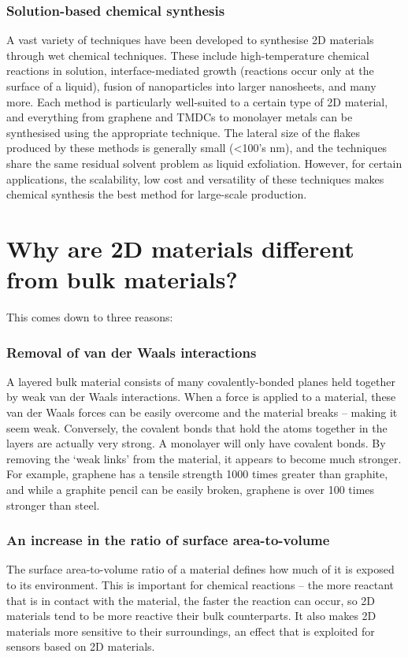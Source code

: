 \documentclass[12pt,a4paper]{report}
\begin{document}
\subsubsection{Solution-based chemical synthesis}
A vast variety of techniques have been developed to synthesise 2D materials through wet chemical techniques. These include high-temperature chemical reactions in solution, interface-mediated growth (reactions occur only at the surface of a liquid), fusion of nanoparticles into larger nanosheets, and many more. Each method is particularly well-suited to a certain type of 2D material, and everything from graphene and TMDCs to monolayer metals can be synthesised using the appropriate technique.
The lateral size of the flakes produced by these methods is generally small (<100’s nm), and the techniques share the same residual solvent problem as liquid exfoliation. However, for certain applications, the scalability, low cost and versatility of these techniques makes chemical synthesis the best method for large-scale production.
 


\section{Why are 2D materials different from bulk materials?}

This comes down to three reasons:
\subsubsection{Removal of van der Waals interactions }
A layered bulk material consists of many covalently-bonded planes held together by weak van der Waals interactions. When a force is applied to a material, these van der Waals forces can be easily overcome and the material breaks – making it seem weak. Conversely, the covalent bonds that hold the atoms together in the layers are actually very strong. A monolayer will only have covalent bonds. By removing the ‘weak links’ from the material, it appears to become much stronger. For example, graphene has a tensile strength 1000 times greater than graphite, and while a graphite pencil can be easily broken, graphene is over 100 times stronger than steel.
\subsubsection{An increase in the ratio of surface area-to-volume }
The surface area-to-volume ratio of a material defines how much of it is exposed to its environment. This is important for chemical reactions – the more reactant that is in contact with the material, the faster the reaction can occur, so 2D materials tend to be more reactive their bulk counterparts. It also makes 2D materials more sensitive to their surroundings, an effect that is exploited for sensors based on 2D materials.
\end{document}
